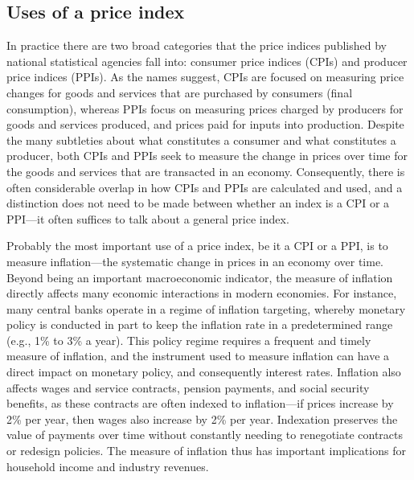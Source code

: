 \documentclass[
]{article}
\begin{document}
\hypertarget{uses-of-a-price-index}{%
\subsection{Uses of a price index}\label{uses-of-a-price-index}}

In practice there are two broad categories that the price indices published by national statistical agencies fall into: consumer price indices (CPIs) and producer price indices (PPIs). As the names suggest, CPIs are focused on measuring price changes for goods and services that are purchased by consumers (final consumption), whereas PPIs focus on measuring prices charged by producers for goods and services produced, and prices paid for inputs into production. Despite the many subtleties about what constitutes a consumer and what constitutes a producer, both CPIs and PPIs seek to measure the change in prices over time for the goods and services that are transacted in an economy. Consequently, there is often
considerable overlap in how CPIs and PPIs are calculated and used, and a distinction does not need to be made between whether an index is a CPI or a PPI---it often suffices to talk about a general price index.

Probably the most important use of a price index, be it a CPI or a PPI, is to measure inflation---the systematic change in prices in an economy over time. Beyond being an important macroeconomic indicator, the measure of inflation directly affects many economic interactions in modern economies. For instance, many central banks operate in a regime of inflation targeting, whereby monetary policy is conducted in part to keep the inflation rate in a predetermined range (e.g., 1\% to 3\% a year). This policy regime requires a frequent and timely measure of inflation, and the instrument used to measure inflation can have a direct impact on monetary policy, and consequently interest rates. Inflation also affects wages and service contracts, pension payments, and social security benefits, as these contracts are often indexed to inflation---if prices increase by 2\% per year, then wages also increase by 2\% per year. Indexation preserves the value of payments over time without constantly needing to renegotiate contracts or redesign policies. The measure of inflation thus has important implications for household income and industry revenues.
\end{document}
